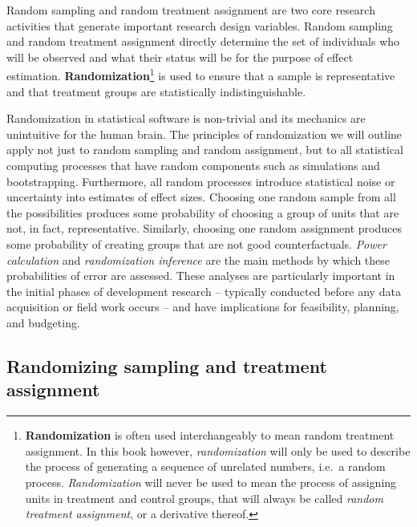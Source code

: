 \documentclass[
]{book}
\begin{document}
Random sampling and random treatment assignment
are two core research activities
that generate important research design variables.
Random sampling and random treatment assignment directly determine
the set of individuals who will be observed
and what their status will be for the purpose of effect estimation.
\textbf{Randomization}\footnote{\textbf{Randomization} is often used interchangeably
  to mean random treatment assignment.
  In this book however, \emph{randomization} will only
  be used to describe the process of generating
  a sequence of unrelated numbers, i.e.~a random process.
  \emph{Randomization} will never be used to mean
  the process of assigning units in treatment and control groups,
  that will always be called \emph{random treatment assignment},
  or a derivative thereof.}
is used to ensure that a sample is representative and
that treatment groups are statistically indistinguishable.

Randomization in statistical software is non-trivial
and its mechanics are unintuitive for the human brain.
The principles of randomization we will outline
apply not just to random sampling and random assignment,
but to all statistical computing processes that have random components
such as simulations and bootstrapping.
Furthermore, all random processes introduce statistical noise
or uncertainty into estimates of effect sizes.
Choosing one random sample from all the possibilities produces some probability of
choosing a group of units that are not, in fact, representative.
Similarly, choosing one random assignment produces some probability of
creating groups that are not good counterfactuals.
\emph{Power calculation} and \emph{randomization inference}
are the main methods by which these probabilities of error are assessed.
These analyses are particularly important in the initial phases of development research --
typically conducted before any data acquisition or field work occurs --
and have implications for feasibility, planning, and budgeting.

\hypertarget{randomizing-sampling-and-treatment-assignment}{%
\subsection*{Randomizing sampling and treatment assignment}\label{randomizing-sampling-and-treatment-assignment}}
\end{document}
